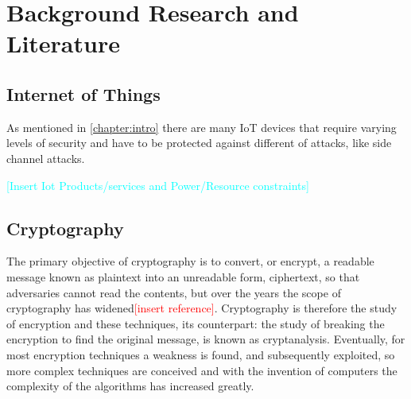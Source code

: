 \documentclass[12pt,twoside,a4paper]{report}
\begin{document}
    \chapter{Background Research and Literature}
    \label{chapter:research}
    
    \section{Internet of Things}
    \label{section:IoT}
    As mentioned in \autoref{chapter:intro} there are many IoT devices that require varying levels of security and have to be protected against different of attacks, like side channel attacks.
    
    \textcolor{cyan}{[Insert Iot Products/services and Power/Resource constraints]}
    
    \section{Cryptography}
    The primary objective of cryptography is to convert, or encrypt, a readable message known as plaintext into an unreadable form, ciphertext, so that adversaries cannot read the contents, but over the years the scope of cryptography has widened\textcolor{red}{[insert reference]}.
    Cryptography is therefore the study of encryption and these techniques, its counterpart: the study of breaking the encryption to find the original message, is known as cryptanalysis.
    Eventually, for most encryption techniques a weakness is found, and subsequently exploited, so more complex techniques are conceived and with the invention of computers the complexity of the algorithms has increased greatly.
    
\end{document}
